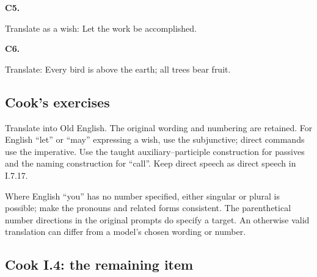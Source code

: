 \par\begin{minipage}{\linewidth}\raggedright
\textbf{C5.}

Translate as a wish: Let the work be accomplished.

\end{minipage}\par\addvspace{4pt}

\par\begin{minipage}{\linewidth}\raggedright
\textbf{C6.}

Translate: Every bird is above the earth; all trees bear fruit.

\end{minipage}\par\addvspace{4pt}

\subsection*{Cook’s exercises}

Translate into Old English. The original wording and numbering are retained. For English “let” or “may” expressing a wish, use the subjunctive; direct commands use the imperative. Use the taught auxiliary–participle construction for passives and the naming construction for “call”. Keep direct speech as direct speech in I.7.17.

Where English “you” has no number specified, either singular or plural is possible; make the pronouns and related forms consistent. The parenthetical number directions in the original prompts do specify a target. An otherwise valid translation can differ from a model’s chosen wording or number.

\subsection*{Cook I.4: the remaining item}

